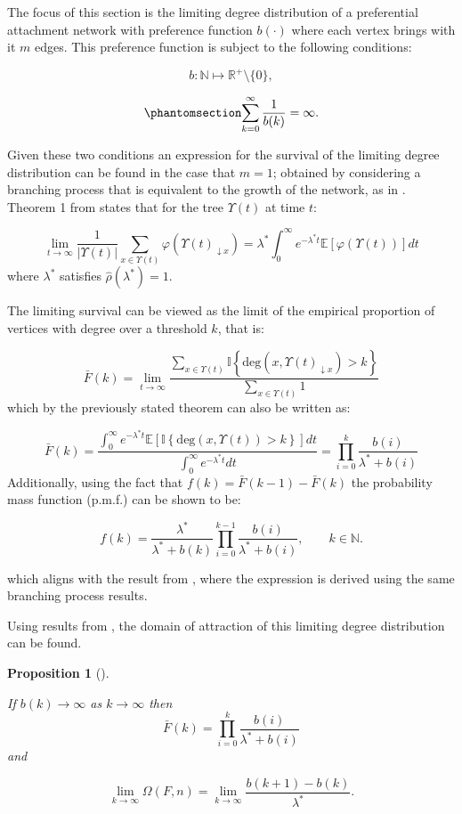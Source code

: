 \documentclass[
  sn-basic,
]{sn-jnl}
\theoremstyle{plain}
\newtheorem{proposition}{Proposition}[section]
\theoremstyle{remark}
\begin{document}
The focus of this section is the limiting degree distribution of a
preferential attachment network with preference function \(b(\cdot)\)
where each vertex brings with it \(m\) edges. This preference function
is subject to the following conditions:

\[
b:\mathbb N \mapsto \mathbb R^+\setminus\{0\},
\]

\begin{equation}\phantomsection\label{eq-condb2}{
\sum_{k=0}^\infty\frac{1}{b(k)} = \infty.
}\end{equation}

Given these two conditions an expression for the survival of the
limiting degree distribution can be found in the case that \(m=1\);
obtained by considering a branching process that is equivalent to the
growth of the network, as in \citep{rudas07}. Theorem 1 from
\citep{rudas07} states that for the tree \(\Upsilon(t)\) at time \(t\):

\[
\lim_{t\rightarrow\infty}\frac{1}{|\Upsilon(t)|}\sum_{x\in\Upsilon(t)}\varphi(\Upsilon(t)_{\downarrow x}) = \lambda^* \int_0^\infty e^{-\lambda^* t}\mathbb E\left[\varphi(\Upsilon(t))\right]dt
\] where \(\lambda^*\) satisfies \(\hat\rho(\lambda^*)=1\).

The limiting survival can be viewed as the limit of the empirical
proportion of vertices with degree over a threshold \(k\), that is:

\[
\bar F(k) = \lim_{t\rightarrow\infty}\frac{\sum_{x\in\Upsilon(t)}\mathbb I\left\{\text{deg}(x,\Upsilon(t)_{\downarrow x})>k\right\}}{\sum_{x\in\Upsilon(t)} 1}
\] which by the previously stated theorem can also be written as:

\[
\bar F(k) = \frac{\int_0^\infty e^{-\lambda^* t}\mathbb E\left[\mathbb I\left\{\text{deg}(x,\Upsilon(t))>k\right\}\right]dt}{\int_0^\infty e^{-\lambda^* t}dt} = \prod_{i=0}^k\frac{b(i)}{\lambda^* + b(i)}
\] Additionally, using the fact that \(f(k) = \bar F(k-1) - \bar F(k)\)
the probability mass function (p.m.f.) can be shown to be:

\[
f(k) = \frac{\lambda^*}{\lambda^* + b(k)}\prod_{i=0}^{k-1}\frac{b(i)}{\lambda^*+b(i)},\qquad k\in\mathbb N.
\]

which aligns with the result from \citet{rudas07}, where the expression
is derived using the same branching process results.

Using results from \citet{shimura12}, the domain of attraction of this
limiting degree distribution can be found.

\begin{proposition}[]\protect\hypertarget{prp-omega}{}\label{prp-omega}

If \(b(k) \rightarrow \infty\) as \(k\rightarrow \infty\) then \[
\bar F(k) = \prod_{i=0}^k\frac{b(i)}{\lambda^* + b(i)}
\] and

\[
\lim_{k\rightarrow\infty}\Omega(F,n) = \lim_{k\rightarrow\infty}\frac{b(k+1)-b(k)}{\lambda^*}.
\]

\end{proposition}
\end{document}
